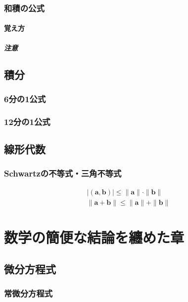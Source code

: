 \documentclass[]{jreport}
\begin{document}
\section{和積の公式}
\subsection{覚え方}
\subsubsection{注意}

\chapter{積分}

\section{6分の1公式}

\section{12分の1公式}

\chapter{線形代数}

\section{Schwartzの不等式・三角不等式}
\begin{equation}
    \begin{array}{l}
        |(\bm{a}, \bm{b})|\le\|\bm{a}\|\cdot\|\bm{b}\|\\
        \|\bm{a}+\bm{b}\|\le\|\bm{a}\|+\|\bm{b}\|
    \end{array}
\end{equation}

\part{数学の簡便な結論を纏めた章}

\chapter{微分方程式}

\section{常微分方程式}
\end{document}
